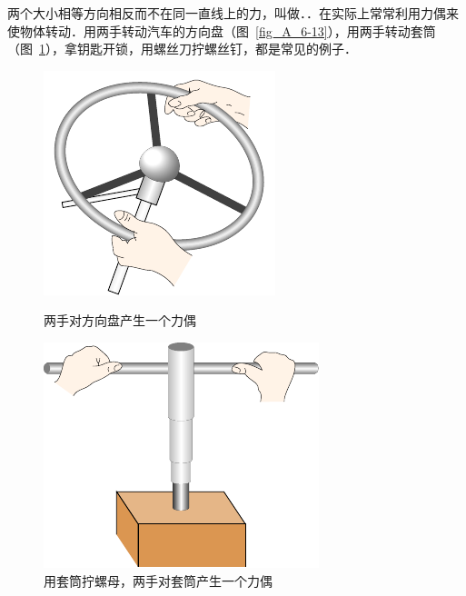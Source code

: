 两个大小相等方向相反而不在同一直线上的力，叫做．．在实际上常常利用力偶来使物体转动．用两手转动汽车的方向盘（图~\ref{fig_A_6-13}），用两手转动套筒（图~\ref{fig_A_6-14}），拿钥匙开锁，用螺丝刀拧螺丝钉，都是常见的例子．
\begin{figure}[htbp]
    \centering
    \begin{minipage}[t]{0.48\textwidth}
        \centering
        \includegraphics{fig/A/6-13.pdf}
        \caption{两手对方向盘产生一个力偶}\label{fig_A_6-13}
    \end{minipage}
    \hfill
    \begin{minipage}[t]{0.48\textwidth}
        \centering
        \includegraphics{fig/A/6-14.pdf}
        \caption{用套筒拧螺母，两手对套筒产生一个力偶}\label{fig_A_6-14}
    \end{minipage}
\end{figure}

